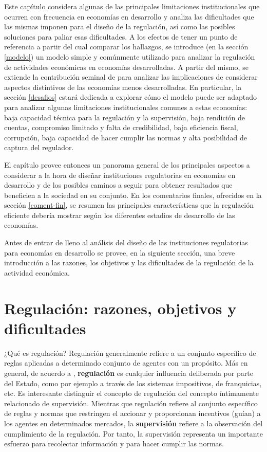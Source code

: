 \documentclass[
  12pt,
  spanish,
]{book}
\begin{document}
Este capítulo considera algunas de las principales limitaciones institucionales que ocurren con frecuencia en economías en desarrollo y analiza las dificultades que las mismas imponen para el diseño de la regulación, así como las posibles soluciones para paliar esas dificultades. A los efectos de tener un punto de referencia a partir del cual comparar los hallazgos, se introduce (en la sección \ref{modelo}) un modelo simple y comúnmente utilizado para analizar la regulación de actividades económicas en economías desarrolladas. A partir del mismo, se extiende la contribución seminal de \citet{Laffont2005} para analizar las implicaciones de considerar aspectos distintivos de las economías menos desarrolladas. En particular, la sección \ref{desafios} estará dedicada a explorar cómo el modelo puede ser adaptado para analizar algunas limitaciones institucionales comunes a estas economías: baja capacidad técnica para la regulación y la supervisión, baja rendición de cuentas, compromiso limitado y falta de credibilidad, baja eficiencia fiscal, corrupción, baja capacidad de hacer cumplir las normas y alta posibilidad de captura del regulador.

El capítulo provee entonces un panorama general de los principales aspectos a considerar a la hora de diseñar instituciones regulatorias en economías en desarrollo y de los posibles caminos a seguir para obtener resultados que beneficien a la sociedad en su conjunto. En los comentarios finales, ofrecidos en la sección \ref{coment-fin}, se resumen las principales características que la regulación eficiente debería mostrar según los diferentes estadios de desarrollo de las economías.

Antes de entrar de lleno al análisis del diseño de las instituciones regulatorias para economías en desarrollo se provee, en la siguiente sección, una breve introducción a las razones, los objetivos y las dificultades de la regulación de la actividad económica.

\hypertarget{regulaciuxf3n-razones-objetivos-y-dificultades}{%
\section{Regulación: razones, objetivos y dificultades}\label{regulaciuxf3n-razones-objetivos-y-dificultades}}

¿Qué es regulación? Regulación generalmente refiere a un conjunto específico de reglas aplicadas a determinado conjunto de agentes con un propósito. Más en general, de acuerdo a \citet{Baldwin2011}, \textbf{regulación} es cualquier influencia deliberada por parte del Estado, como por ejemplo a través de los sistemas impositivos, de franquicias, etc. Es interesante distinguir el concepto de regulación del concepto íntimamente relacionado de supervisión. Mientras que regulación refiere al conjunto específico de reglas y normas que restringen el accionar y proporcionan incentivos (guían) a los agentes en determinados mercados, la \textbf{supervisión} refiere a la observación del cumplimiento de la regulación. Por tanto, la supervisión representa un importante esfuerzo para recolectar información y para hacer cumplir las normas.
\end{document}
